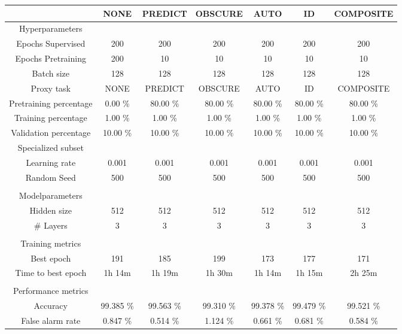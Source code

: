\begin{table}[htb]
    \centering
    \begin{tabular}{@{}ccccccc@{}}
        \toprule
         &  NONE &  PREDICT &  OBSCURE &  AUTO &  ID &  COMPOSITE \\
        \midrule
        Hyperparameters &  &  &  &  &  &  \\
        Epochs Supervised &  200 &  200 &  200 &  200 &  200 &  200 \\
        Epochs Pretraining &  200 &  10 &  10 &  10 &  10 &  10 \\
        Batch size &  128 &  128 &  128 &  128 &  128 &  128 \\
        Proxy task &  NONE &  PREDICT &  OBSCURE &  AUTO &  ID &  COMPOSITE \\
        Pretraining percentage &  0.00 \% &  80.00 \% &  80.00 \% &  80.00 \% &  80.00 \% &  80.00 \% \\
        Training percentage &  1.00 \% &  1.00 \% &  1.00 \% &  1.00 \% &  1.00 \% &  1.00 \% \\
        Validation percentage &  10.00 \% &  10.00 \% &  10.00 \% &  10.00 \% &  10.00 \% &  10.00 \% \\
        Specialized subset &   &   &   &   &   &   \\
        Learning rate &  0.001 &  0.001 &  0.001 &  0.001 &  0.001 &  0.001 \\
        Random Seed &  500 &  500 &  500 &  500 &  500 &  500 \\
         \\
        Modelparameters &  &  &  &  &  &  \\
        Hidden size &  512 &  512 &  512 &  512 &  512 &  512 \\
        \# Layers &  3 &  3 &  3 &  3 &  3 &  3 \\
         \\
        Training metrics &  &  &  &  &  &  \\
        Best epoch &  191 &  185 &  199 &  173 &  177 &  171 \\
        Time to best epoch &  1h 14m &  1h 19m &  1h 30m &  1h 14m &  1h 15m &  2h 25m \\
         \\
        Performance metrics &  &  &  &  &  &  \\
        Accuracy &  99.385 \% &  99.563 \% &  99.310 \% &  99.378 \% &  99.479 \% &  99.521 \% \\
        False alarm rate &  0.847 \% &  0.514 \% &  1.124 \% &  0.661 \% &  0.681 \% &  0.584 \% \\

\end{tabular}
\end{table}
